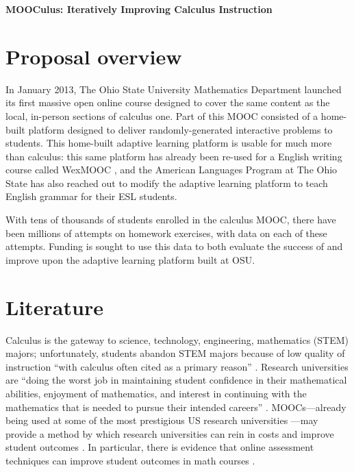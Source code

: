 \documentclass[12pt]{article}
\begin{document}
\begin{center}
  \textbf{MOOCulus: Iteratively Improving Calculus Instruction}
\end{center}

% 

\section{Proposal overview}

In January 2013, The Ohio State University Mathematics Department
launched its first massive open online course designed to cover the
same content as the local, in-person sections of calculus one.  Part
of this MOOC consisted of a home-built platform designed to deliver
randomly-generated interactive problems to students.  This home-built
adaptive learning platform is usable for much more than calculus: this
same platform has already been re-used for a English writing course
called WexMOOC \parencite{gates-foundation-grant}, and the American
Languages Program at The Ohio State has also reached out to modify the
adaptive learning platform to teach English grammar for their ESL
students.

With tens of thousands of students enrolled in the calculus MOOC,
there have been millions of attempts on homework exercises, with data
on each of these attempts.  Funding is sought to use this data to both
evaluate the success of and improve upon the adaptive learning
platform built at OSU.

\section{Literature}

Calculus is the gateway to science, technology, engineering,
mathematics (STEM) majors; unfortunately, students abandon STEM majors
because of low quality of instruction ``with calculus often cited as a
primary reason'' \parencite{calculus-programs}.  Research universities
are ``doing the worst job in maintaining student confidence in their
mathematical abilities, enjoyment of mathematics, and interest in
continuing with the mathematics that is needed to pursue their
intended careers'' \parencite{calculus-students}.  MOOCs---already
being used at some of the most prestigious US research
universities \parencite{morris2013moocs}---may provide a method by
which research universities can rein in costs and improve student
outcomes \parencite{bowen2013higher}.  In particular, there is
evidence that online assessment techniques can improve student
outcomes in math courses \parencite{angus2009does}.
\end{document}
